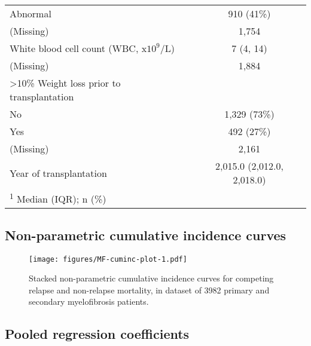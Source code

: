\documentclass[
  12pt,
  a4paper,
]{article}
\begin{document}
\begin{longtable}[t]{lc}
\hspace{1em}Abnormal & 910 (41\%)\\
\hspace{1em}(Missing) & 1,754\\
White blood cell count (WBC, x$10^9$/L) & 7 (4, 14)\\
\hspace{1em}(Missing) & 1,884\\
>10\% Weight loss prior to transplantation & \\
\hspace{1em}No & 1,329 (73\%)\\
\hspace{1em}Yes & 492 (27\%)\\
\hspace{1em}(Missing) & 2,161\\
Year of transplantation & 2,015.0 (2,012.0, 2,018.0)\\
\bottomrule
\multicolumn{2}{l}{\rule{0pt}{1em}\textsuperscript{1} Median (IQR); n (\%)}\\

\end{longtable}

\subsection{Non-parametric cumulative incidence
curves}\label{non-parametric-cumulative-incidence-curves}

\begin{figure}[H]

{\centering \texttt{[image: figures/MF-cuminc-plot-1.pdf]}

}

\caption{Stacked non-parametric cumulative incidence curves for
competing relapse and non-relapse mortality, in dataset of 3982 primary
and secondary myelofibrosis patients.}

\end{figure}%

\subsection{Pooled regression
coefficients}\label{pooled-regression-coefficients}

\begingroup\fontsize{9}{11}\selectfont
\end{document}
